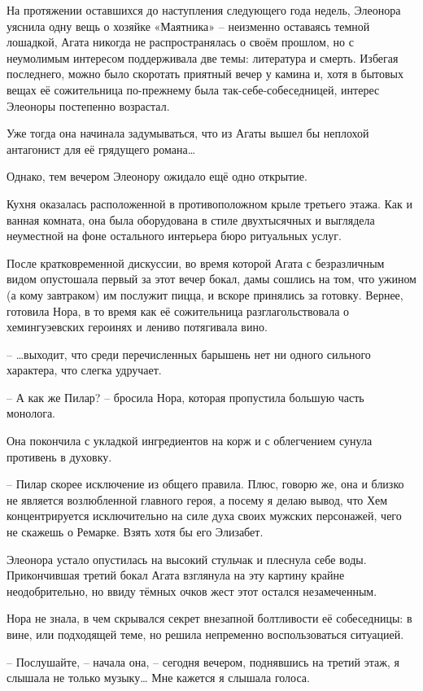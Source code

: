\documentclass[
  a5paperpaper,
  DIV=11,
  numbers=noendperiod]{scrreprt}
\begin{document}

На протяжении оставшихся до наступления следующего года недель, Элеонора
уяснила одну вещь о хозяйке «Маятника» -- неизменно оставаясь темной
лошадкой, Агата никогда не распространялась о своём прошлом, но с
неумолимым интересом поддерживала две темы: литература и смерть. Избегая
последнего, можно было скоротать приятный вечер у камина и, хотя в
бытовых вещах её сожительница по-прежнему была так-себе-собеседницей,
интерес Элеоноры постепенно возрастал.

Уже тогда она начинала задумываться, что из Агаты вышел бы неплохой
антагонист для её грядущего романа\ldots{}

Однако, тем вечером Элеонору ожидало ещё одно открытие.

Кухня оказалась расположенной в противоположном крыле третьего этажа.
Как и ванная комната, она была оборудована в стиле двухтысячных и
выглядела неуместной на фоне остального интерьера бюро ритуальных услуг.

После кратковременной дискуссии, во время которой Агата с безразличным
видом опустошала первый за этот вечер бокал, дамы сошлись на том, что
ужином (а кому завтраком) им послужит пицца, и вскоре принялись за
готовку. Вернее, готовила Нора, в то время как её сожительница
разглагольствовала о хемингуэевских героинях и лениво потягивала вино.

-- \ldots выходит, что среди перечисленных барышень нет ни одного
сильного характера, что слегка удручает.

-- А как же Пилар? -- бросила Нора, которая пропустила большую часть
монолога.

Она покончила с укладкой ингредиентов на корж и с облегчением сунула
противень в духовку.

-- Пилар скорее исключение из общего правила. Плюс, говорю же, она и
близко не является возлюбленной главного героя, а посему я делаю вывод,
что Хем концентрируется исключительно на силе духа своих мужских
персонажей, чего не скажешь о Ремарке. Взять хотя бы его Элизабет.

Элеонора устало опустилась на высокий стульчак и плеснула себе воды.
Прикончившая третий бокал Агата взглянула на эту картину крайне
неодобрительно, но ввиду тёмных очков жест этот остался незамеченным.

Нора не знала, в чем скрывался секрет внезапной болтливости её
собеседницы: в вине, или подходящей теме, но решила непременно
воспользоваться ситуацией.

-- Послушайте, -- начала она, -- сегодня вечером, поднявшись на третий
этаж, я слышала не только музыку\ldots{} Мне кажется я слышала голоса.
\end{document}
